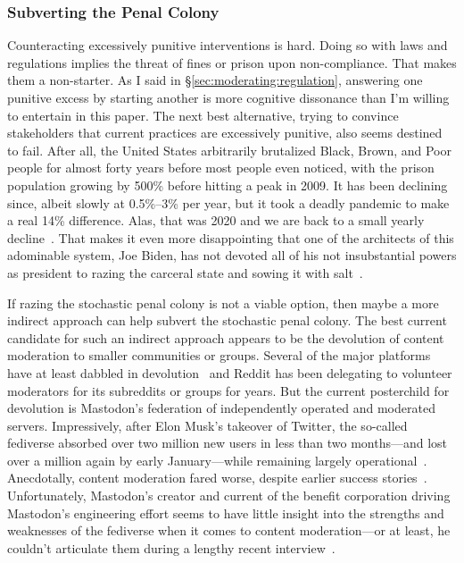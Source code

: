 \subsubsection{Subverting the Penal Colony}
\label{sec:devolution}

Counteracting excessively punitive interventions is hard. Doing so with laws and
regulations implies the threat of fines or prison upon non-compliance. That
makes them a non-starter. As I said in \S\ref{sec:moderating:regulation},
answering one punitive excess by starting another is more cognitive dissonance
than I'm willing to entertain in this paper. The next best alternative, trying
to convince stakeholders that current practices are excessively punitive, also
seems destined to fail. After all, the United States arbitrarily brutalized
Black, Brown, and Poor people for almost forty years before most people even
noticed, with the prison population growing by 500\% before hitting a peak in
2009. It has been declining since, albeit slowly at 0.5\%--3\% per year, but it
took a deadly pandemic to make a real 14\% difference. Alas, that was 2020 and
we are back to a small yearly decline~\cite{Nellis2023}. That makes it even more
disappointing that one of the architects of this adominable system, Joe Biden,
has not devoted all of his not insubstantial powers as  president to razing
the carceral state and sowing it with
salt~\cite{Reinhart2022,StolbergHerndon2019}.

If razing the stochastic penal colony is not a viable option, then maybe a more
indirect approach can help subvert the stochastic penal colony. The best current
candidate for such an indirect approach appears to be the devolution of content
moderation to smaller communities or groups. Several of the major platforms have
at least dabbled in devolution~\cite{Goodman2021,Hern2021,Instagram2021} and
Reddit has been delegating to volunteer moderators for its subreddits or groups
for years. But the current posterchild for devolution is Mastodon's federation
of independently operated and moderated servers. Impressively, after Elon Musk's
takeover of Twitter, the so-called fediverse absorbed over two million new users
in less than two months---and lost over a million again by early January---while
remaining largely operational~\cite{Hoover2023,Peters2022}. Anecdotally, content
moderation fared worse, despite earlier success
stories~\cite{Cathcart2023,CopiaInstitute2021,Hall2023,Rozenshtein2022}.
Unfortunately, Mastodon's creator and current  of the benefit corporation
driving Mastodon's engineering effort seems to have little insight into the
strengths and weaknesses of the fediverse when it comes to content
moderation---or at least, he couldn't articulate them during a lengthy recent
interview~\cite{Patel2023}.

